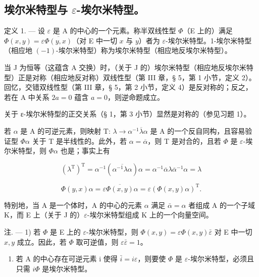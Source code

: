 \subsection{\texorpdfstring{埃尔米特型与 \(\varepsilon\)-埃尔米特型。}{埃尔米特型与 epsilon-埃尔米特型。}}

定义 1. --- 设 \(\varepsilon\) 是 A 的中心的一个元素。称半双线性型 \(\Phi\)（E 上的）满足 \(\Phi(x, y) = \varepsilon \overline{\Phi(y, x)}\)（对 E 中一切 \(x\) 与 \(y\)）者为 \(\varepsilon\)-埃尔米特型。1-埃尔米特型（相应地 \((-1)\)-埃尔米特型）称为埃尔米特型（相应地反埃尔米特型）。

当 J 为恒等（这蕴含 A 交换）时，（关于 J 的）埃尔米特型（相应地反埃尔米特型）正是对称（相应地反对称）双线性型（第 III 章，§ 5，第 1 小节，定义 2）。回忆，交错双线性型（第 III 章，§ 5，第 2 小节，定义 4）是反对称的；反之，若在 A 中关系 \(2a = 0\) 蕴含 \(a = 0\)，则逆命题成立。

关于 ε-埃尔米特型的正交关系（§ 1，第 3 小节）显然是对称的（参见习题 1）。

若 \(\alpha\) 是 A 的可逆元素，则映射 T: \(\lambda \to \alpha^{-1}\overline{\lambda}\alpha\) 是 A 的一个反自同构，且容易验证型 \(\Phi\alpha\) 关于 T 是半线性的。此外，若 \(\alpha = \overline{\alpha}\)，则 T 是对合的，且若 \(\Phi\) 是 \(\varepsilon\)-埃尔米特型，则 \(\Phi\alpha\) 也是；事实上有

\[
(\lambda^ {\mathrm{T}}) ^ {\mathrm{T}} = \alpha^ {- 1} (\overline {{\alpha^ {- 1} \lambda \alpha}}) \alpha = \alpha^ {- 1} \overline {{\alpha}} \lambda \overline {{\alpha}} ^ {- 1} \alpha = \lambda
\]

\[
\Phi (y, x) \alpha = \varepsilon \overline {{\Phi (x , y)}} \alpha = \varepsilon (\Phi (x, y) \alpha) ^ {\mathrm{T}}.
\]

特别地，当 A 是一个体时，A 的中心的元素 \(\alpha\) 满足 \(\bar{\alpha} = \alpha\) 者组成 A 的一个子域 K，而 E 上（关于 J 的）\(\varepsilon\)-埃尔米特型组成 K 上的一个向量空间。

注. --- 1) 若 \(\Phi\) 是 E 上的 \(\varepsilon\)-埃尔米特型，则 \(\Phi(x, y) = \varepsilon \Phi(x, y) \bar{\varepsilon}\) 对 E 中一切 \(x, y\) 成立。因此，若 \(\Phi\) 取可逆值，则 \(\varepsilon \bar{\varepsilon} = 1\)。

\begin{enumerate}
\def\labelenumi{\arabic{enumi})}
\setcounter{enumi}{1}
\tightlist
\item
  若 A 的中心存在可逆元素 i 使得 \(\bar{i}=i\varepsilon\)，则要使 \(\Phi\) 是 \(\varepsilon\)-埃尔米特型，必须且只需 \(i\Phi\) 是埃尔米特型。
\end{enumerate}

